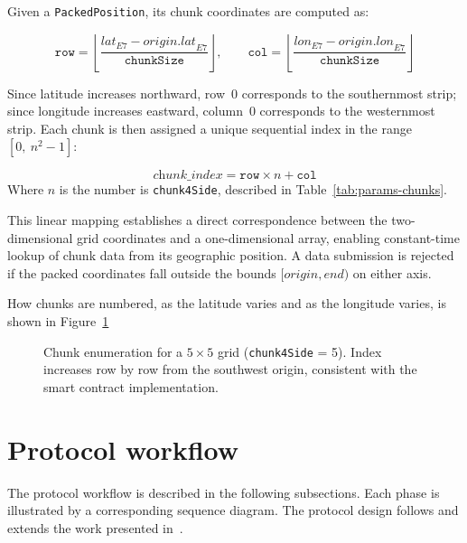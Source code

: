 Given a \texttt{PackedPosition}, its chunk coordinates are computed as:

\begin{equation}
    \texttt{row} = \left\lfloor \frac{\textit{lat}_{E7} -
    \textit{origin.lat}_{E7}}{\texttt{chunkSize}} \right\rfloor, \qquad
    \texttt{col} = \left\lfloor \frac{\textit{lon}_{E7} -
    \textit{origin.lon}_{E7}}{\texttt{chunkSize}} \right\rfloor
    \label{eq:row-col}
\end{equation}

Since latitude increases northward, row~$0$ corresponds to the southernmost
strip; since longitude increases eastward, column~$0$ corresponds to the
westernmost strip.
Each chunk is then assigned a unique sequential index in the range $[0,\ n^2 - 1]$:

\begin{equation}
    \textit{chunk\_index} = \texttt{row} \times n + \texttt{col}
    \label{eq:chunk-index}
\end{equation}
Where $n$ is the number is \texttt{chunk4Side}, described in Table~\ref{tab:params-chunks}.

This linear mapping establishes a direct correspondence between the
two-dimensional grid coordinates and a one-dimensional array, enabling
constant-time lookup of chunk data from its geographic position.
A data submission is rejected if the packed coordinates fall outside the bounds
$[\textit{origin}, \textit{end})$ on either axis.

How chunks are numbered, as the latitude varies and as the longitude varies, is shown in Figure~\ref{fig:proto-design-chunk-enumeration}
\begin{figure}
    \centering
    
    \caption{Chunk enumeration for a $5 \times 5$ grid (\texttt{chunk4Side} = 5). Index increases row by row from the southwest origin, consistent with the smart contract implementation.}
    \label{fig:proto-design-chunk-enumeration}
\end{figure}


\section{Protocol workflow}\label{sec:proto-workflow}
The protocol workflow is described in the following subsections.
Each phase is illustrated by a corresponding sequence diagram.
The protocol design follows and extends the work presented in~\cite{bedogni2024crowdsensing}.

